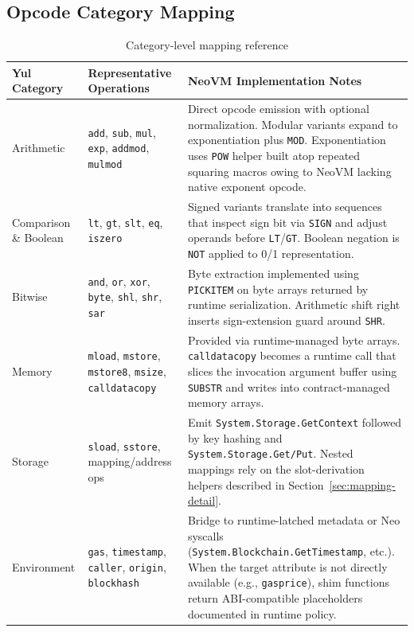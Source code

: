 \documentclass[11pt]{article}
\begin{document}
\subsection{Opcode Category Mapping}
\begin{table}[H]
\centering
\caption{Category-level mapping reference}
\begin{tabularx}{\textwidth}{@{}p{}p{}X@{}}
\toprule
Yul Category & Representative Operations & NeoVM Implementation Notes \\
\midrule
Arithmetic & \texttt{add}, \texttt{sub}, \texttt{mul}, \texttt{exp}, \texttt{addmod}, \texttt{mulmod} & Direct opcode emission with optional normalization. Modular variants expand to exponentiation plus \texttt{MOD}. Exponentiation uses \texttt{POW} helper built atop repeated squaring macros owing to NeoVM lacking native exponent opcode.\\
Comparison \& Boolean & \texttt{lt}, \texttt{gt}, \texttt{slt}, \texttt{eq}, \texttt{iszero} & Signed variants translate into sequences that inspect sign bit via \texttt{SIGN} and adjust operands before \texttt{LT}/\texttt{GT}. Boolean negation is \texttt{NOT} applied to 0/1 representation.\\
Bitwise & \texttt{and}, \texttt{or}, \texttt{xor}, \texttt{byte}, \texttt{shl}, \texttt{shr}, \texttt{sar} & Byte extraction implemented using \texttt{PICKITEM} on byte arrays returned by runtime serialization. Arithmetic shift right inserts sign-extension guard around \texttt{SHR}.\\
Memory & \texttt{mload}, \texttt{mstore}, \texttt{mstore8}, \texttt{msize}, \texttt{calldatacopy} & Provided via runtime-managed byte arrays. \texttt{calldatacopy} becomes a runtime call that slices the invocation argument buffer using \texttt{SUBSTR} and writes into contract-managed memory arrays.\\
Storage & \texttt{sload}, \texttt{sstore}, mapping/address ops & Emit \texttt{System.Storage.GetContext} followed by key hashing and \texttt{System.Storage.Get/Put}. Nested mappings rely on the slot-derivation helpers described in Section~\ref{sec:mapping-detail}.\\
Environment & \texttt{gas}, \texttt{timestamp}, \texttt{caller}, \texttt{origin}, \texttt{blockhash} & Bridge to runtime-latched metadata or Neo syscalls (\texttt{System.Blockchain.GetTimestamp}, etc.). When the target attribute is not directly available (e.g., \texttt{gasprice}), shim functions return ABI-compatible placeholders documented in runtime policy.\\

\end{tabularx}
\end{table}
\end{document}

